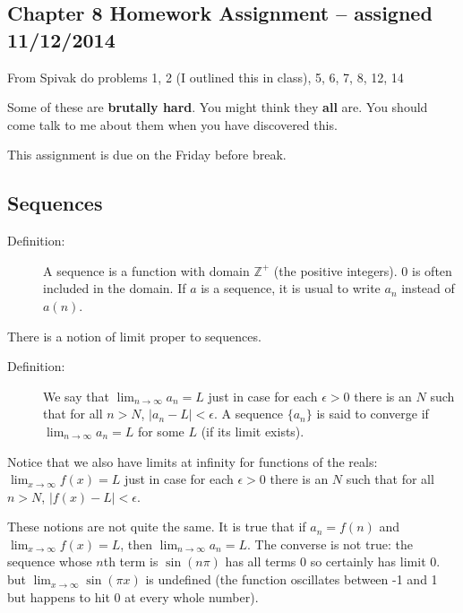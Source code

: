\documentclass[12pt]{article}
\begin{document}
\begin{description}
\begin{description}
\end{description}

\end{description}

\subsection{Chapter 8 Homework Assignment --  assigned 11/12/2014}

From Spivak do problems 1, 2 (I outlined this in class), 5, 6, 7, 8, 12, 14

Some of these are {\bf brutally hard}.   You might think they {\bf all} are.   You should come talk to me about them when you have discovered this.

This assignment is due on the Friday before break.

\subsection{Sequences}

\begin{description}

\item[Definition:]  A sequence is a function with domain ${\mathbb Z}^+$ (the positive integers).  0 is often included in the domain.  If $a$ is a sequence, it is usual to write $a_n$ instead of $a(n)$.

\end{description}

There is a notion of limit proper to sequences.

\begin{description}

\item[Definition:]  We say that $\lim_{n \rightarrow \infty}a_n=L$ just in case for each $\epsilon>0$ there is an $N$ such that for all $n>N$, $|a_n-L|<\epsilon$.  A sequence $\{a_n\}$ is said to converge if $\lim_{n \rightarrow \infty}a_n=L$ for some $L$ (if its limit exists).

\end{description}

Notice that we also have limits at infinity for functions of the reals:  $\lim_{x \rightarrow \infty}f(x)=L$ just in case for each $\epsilon>0$ there is an $N$ such that for all $n>N$, $|f(x)-L|<\epsilon$.

These notions are not quite the same.  It is true that if $a_n=f(n)$ and $\lim_{x \rightarrow \infty}f(x)=L$, then $\lim_{n \rightarrow \infty}a_n=L$.  The converse is not true:  the sequence whose $n$th term is $\sin(n\pi)$ has all terms 0
so certainly has limit 0. but $\lim_{x \rightarrow \infty}\sin(\pi x)$ is undefined (the function oscillates between -1 and 1 but happens to hit 0 at every whole number).
\end{document}
